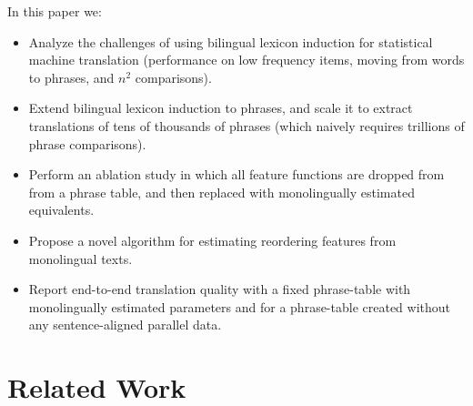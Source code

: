 \documentclass[11pt]{article}
\newcommand{\mnote}[1]{\marginpar{%
  \vskip-\baselineskip
  \raggedright\footnotesize
  \itshape\hrule\smallskip\tiny{#1}\par\smallskip\hrule}}
\newcommand{\mtodo}[1]{\mnote{\textcolor{red}{#1}}}
\newcommand{\secref}[1]{Section~\ref{#1}}
\begin{document}


In this paper we:
\begin{itemize}
\item Analyze the challenges of using bilingual lexicon induction for statistical machine translation (performance on low frequency items, moving from words to phrases, and $n^2$ comparisons).\mtodo{define n, make more clear}
\item Extend bilingual lexicon induction to phrases, and scale it to extract translations of tens of thousands of  phrases (which naively requires trillions of phrase comparisons). 
\item Perform an ablation study in which all feature functions are dropped from from a phrase table, and then replaced with monolingually estimated equivalents.
\item Propose a novel algorithm for estimating reordering features from monolingual texts.
\item Report end-to-end translation quality with a fixed phrase-table with monolingually estimated parameters and for a phrase-table created without any sentence-aligned parallel data.
\end{itemize}

\section{Related Work} \label{sect:related-work}
\end{document}
